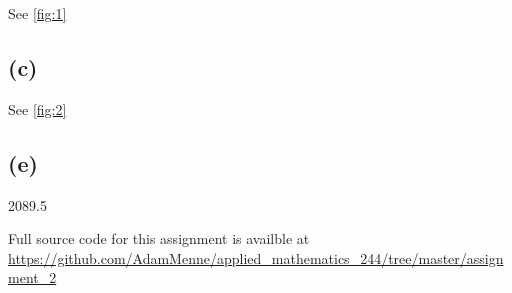 \documentclass[a4paper, british]{article}
\begin{document}

See \cref{fig:1}

\subsection*{(c)}

See \cref{fig:2}

\subsection*{(e)}

2089.5

 Full source code for this assignment is availble at \url{https://github.com/AdamMenne/applied_mathematics_244/tree/master/assignment_2}
\end{document}

